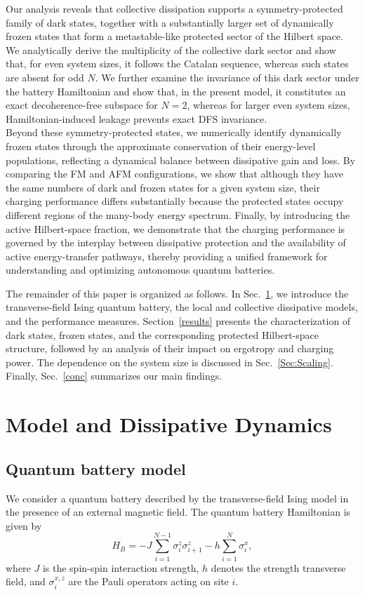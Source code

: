 \documentclass[aps,superscriptaddress,twocolumn,pre,longbibliography,floatfix]{revtex4-1}
\begin{document}
	
	Our analysis reveals that collective dissipation supports a symmetry-protected family of dark states, together with a substantially larger set of dynamically frozen states that form a metastable-like protected sector of the Hilbert space. We analytically derive the multiplicity of the collective dark sector and show that, for even system sizes, it follows the Catalan sequence, whereas such states are absent for odd $N$. We further examine the invariance of this dark sector under the battery Hamiltonian and show that, in the present model, it constitutes an exact decoherence-free subspace for $N=2$, whereas for larger even system sizes, Hamiltonian-induced leakage prevents exact DFS invariance.\\
	Beyond these symmetry-protected states, we numerically identify dynamically frozen states through the approximate conservation of their energy-level populations, reflecting a dynamical balance between dissipative gain and loss. By comparing the FM and AFM configurations, we show that although they have the same numbers of dark and frozen states for a given system size, their charging performance differs substantially because the protected states occupy different regions of the many-body energy spectrum. Finally, by introducing the active Hilbert-space fraction, we demonstrate that the charging performance is governed by the interplay between dissipative protection and the availability of active energy-transfer pathways, thereby providing a unified framework for understanding and optimizing autonomous quantum batteries.
	
	The remainder of this paper is organized as follows. In Sec.~\ref{model}, we introduce the transverse-field Ising quantum battery, the local and collective dissipative models, and the performance measures. Section~\ref{results} presents the characterization of dark states, frozen states, and the corresponding protected Hilbert-space structure, followed by an analysis of their impact on ergotropy and charging power. The dependence on the system size is discussed in Sec.~\ref{Sec:Scaling}. Finally, Sec.~\ref{conc} summarizes our main findings.
	\section{Model and Dissipative Dynamics}\label{model}
	\subsection{Quantum battery model}
	We consider a quantum battery described by the transverse-field Ising model in the presence of an external magnetic field. The quantum battery Hamiltonian is given by
	\begin{equation}
		H_B = - J \sum_{i=1}^{N-1} \sigma_i^z \sigma_{i+1}^z - h \sum_{i=1}^{N} \sigma_i^x,
	\end{equation}
	where \(J\) is the spin-spin interaction strength, \(h\) denotes the strength transverse field, and \(\sigma_i^{x,z}\) are the Pauli operators acting on site \(i\).
	
\end{document}
